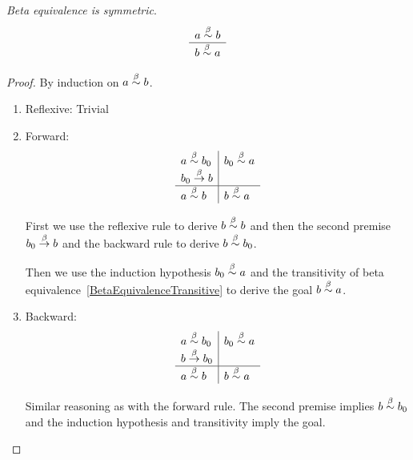 \begin{theorem}
    \label{BetaEquivalenceSymmetric}
    \emph{Beta equivalence is symmetric}.
    $$
    \begin{array}{c} a \stackrel{\beta}{\sim} b \\ \hline b \stackrel{\beta}{\sim} a\end{array}
    $$

    \begin{proof}
        By induction on $a \stackrel{\beta}{\sim} b$.
        \begin{enumerate}
            \item Reflexive: Trivial

            \item Forward:
                $$
                \begin{array}{l|l}
                    a \stackrel{\beta}{\sim} b_0
                    &
                    b_0 \stackrel{\beta}{\sim} a
                    \\
                    b_0 \stackrel{\beta}{\to} b
                    \\
                    \hline
                    a \stackrel{\beta}{\sim} b
                    &
                    b \stackrel{\beta}{\sim} a
                \end{array}
                $$

                First we use the reflexive rule to derive $b \stackrel{\beta}{\sim} b$  and
                then the second premise $b_0 \stackrel{\beta}{\to} b$ and the backward rule
                to derive $b \stackrel{\beta}{\sim} b_0$.

                Then we use the induction hypothesis $b_0 \stackrel{\beta}{\sim} a$ and the
                transitivity of beta equivalence~\ref{BetaEquivalenceTransitive}
                to derive the goal $b \stackrel{\beta}{\sim} a$.

            \item Backward:
                $$
                \begin{array}{l|l}
                    a \stackrel{\beta}{\sim} b_0
                    &
                    b_0 \stackrel{\beta}{\sim} a
                    \\
                    b \stackrel{\beta}{\to} b_0
                    \\
                    \hline
                    a \stackrel{\beta}{\sim} b
                    &
                    b \stackrel{\beta}{\sim} a
                \end{array}
                $$

                Similar reasoning as with the forward rule. The second premise
                implies $b \stackrel{\beta}{\sim} b_0$ and the induction hypothesis and
                transitivity imply the goal.
        \end{enumerate}
    \end{proof}
\end{theorem}


